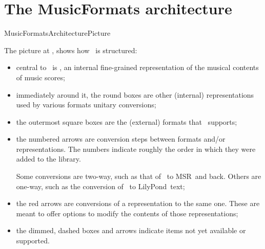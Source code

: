 



\chapter{The MusicFormats architecture}\label{The MusicFormats architecture}

{MusicFormatsArchitecturePicture}

The picture at , shows how \mf\ is structured:
\begin{itemize}
\item central to \mf\ is \msrRepr, an internal fine-grained representation of the musical contents of music scores;

\item immediately around it, the round boxes are other (internal) representations used by various formats unitary conversions;

\item the outermost square boxes are the (external) formats that \mf\ supports;

\item the numbered arrows are conversion steps between formats and/or representations. The numbers indicate roughly the order in which they were added to the library.

Some conversions are two-way, such as that of \mxsrRepr\ to MSR\ and back. Others are one-way, such as the conversion of \lpsrRepr\ to LilyPond\ text;

\item the red arrows are conversions of a representation to the same one. These are meant to offer options to modify the contents of those representations;

\item the dimmed, dashed boxes and arrows indicate items not yet available or supported.

\end{itemize}

